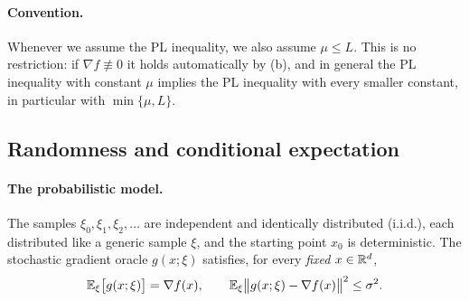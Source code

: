 \paragraph{Convention.} Whenever we assume the PL inequality, we also assume $\mu\le L$.
This is no restriction: if $\nabla f\not\equiv0$ it holds automatically by (b), and in
general the PL inequality with constant $\mu$ implies the PL inequality with every smaller
constant, in particular with $\min\{\mu,L\}$.

\subsection{Randomness and conditional expectation}\label{sec:conditional}

\paragraph{The probabilistic model.} The samples $\xi_0,\xi_1,\xi_2,\dots$ are independent
and identically distributed (i.i.d.), each distributed like a generic sample $\xi$, and the
starting point $x_0$ is deterministic. The stochastic gradient
oracle $g(x;\xi)$ satisfies, for every \emph{fixed} $x\in\mathbb{R}^d$,
\begin{equation}\label{eq:oracle}
  \mathbb{E}_\xi\bigl[g(x;\xi)\bigr]=\nabla f(x),\qquad
  \mathbb{E}_\xi\bigl\lVert g(x;\xi)-\nabla f(x)\bigr\rVert^2\le\sigma^2 .
\end{equation}

